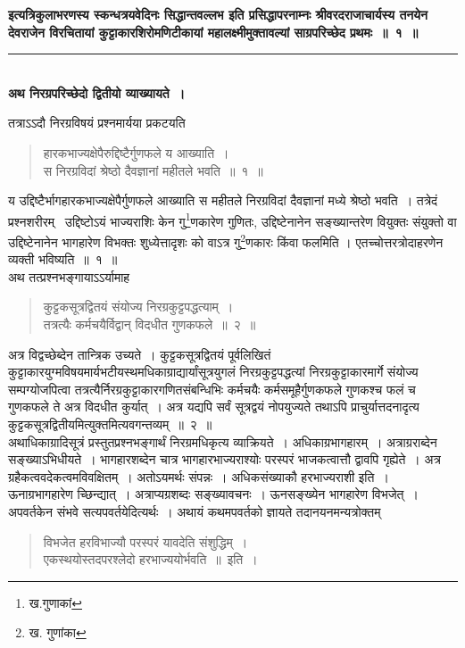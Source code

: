 \documentclass[11pt, openany]{book}
\begin{document}
\centering
\textbf{इत्यत्रिकुलाभरणस्य स्कन्धत्रयवेदिनः सिद्धान्तवल्लभ इति प्रसिद्धापरनाम्नः श्रीवरदराजाचार्यस्य तनयेन देवराजेन विरचितायां कुट्टाकारशिरोमणिटीकायां महालक्ष्मीमुक्तावल्यां साग्रपरिच्छेद प्रथमः~॥~१~॥\\}
\rule{0.2\linewidth}{1.0pt}\\
\vspace{1cm}
\justifying
\indent
\textbf{अथ निरग्रपरिच्छेदो द्वितीयो व्याख्यायते~। \\}

तत्राऽऽदौ निरग्रविषयं प्रश्नमार्यया प्रकटयति\textendash
\begin{quote}
{\ks हारकभाज्यक्षेपैरुद्दिष्टैर्गुणफले य आख्याति~।\\
स निरग्रविदां श्रेष्ठो दैवज्ञानां महीतले भवति~॥~१~॥}
\end{quote}
\indent
य उद्दिष्टैर्भागहारकभाज्यक्षेपैर्गुणफले आख्याति स महीतले निरग्रविदां दैवज्ञानां मध्ये श्रेष्ठो भवति~। तत्रेदं प्रश्नशरीरम् \textendash\ उद्दिष्टोऽयं भाज्यराशिः केन गु\renewcommand\thefootnote{१}\footnote{ख.गुणाकां}णकारेण गुणितः, उद्दिष्टेनानेन सङ्ख्यान्तरेण वियुक्तः संयुक्तो वा उद्दिष्टेनानेन भागहारेण विभक्तः शुध्येत्तादृशः को वाऽत्र गु\renewcommand\thefootnote{२}\footnote{ख. गुणांका}णकारः किंवा फलमिति । एतच्चोत्तरत्रोदाहरणेन व्यक्ती भविष्यति~॥~१~॥\\
\indent
अथ तत्प्रश्नभङ्गायाऽऽर्यामाह\textendash
\begin{quote}
{\ks कुट्टकसूत्रद्वितयं संयोज्य निरग्रकुट्टपद्धत्याम्~।\\
तत्रत्यैः कर्मचयैर्विद्वान् विदधीत गुणकफले~॥~२~॥}
\end{quote}

\newpage
\thispagestyle{fancy}
\fancyhf{}

\indent
अत्र विद्वच्छेब्देन तान्त्रिक उच्यते~। कुट्टकसूत्रद्वितयं पूर्वलिखितं कुट्टाकारयुग्मविषयमार्यभटीयस्थमधिकाग्राद्यार्यांसूत्रयुगलं निरग्रकुट्टपद्धत्यां निरग्रकुट्टाकारमार्गे संयोज्य सम्पग्योजपित्वा तत्रत्यैर्निरग्रकुट्टाकारगणितसंबन्धिभिः कर्मचयैः कर्मसमूहैर्गुणकफले गुणकश्च फलं च गुणकफले ते अत्र विदधीत कुर्यात्~। अत्र यद्यपि सर्वं सूत्रद्वयं नोपयुज्यते तथाऽपि प्राचुर्यात्तदनादृत्य कुट्टकसूत्रद्वितीयमित्युक्तमित्यवगन्तव्यम्~॥~२~॥\\

\indent
अथाधिकाग्रादिसूत्रं प्रस्तुतप्रश्नभङ्गार्थं निरग्रमधिकृत्य व्याक्रियते~। अधिकाग्रभागहारम्~। अत्राग्रराब्देन सङ्ख्याऽभिधीयते~। भागहारशब्देन चात्र भागहारभाज्यराश्योः परस्परं भाजकत्वात्तौ द्वावपि गृह्येते~। अत्र ग्रहैकत्ववदेकत्वमविवक्षितम्~। अतोऽयमर्थः संपन्नः~। अधिकसंख्याकौ हरभाज्यराशी इति~। ऊनाग्रभागहारेण च्छिन्द्यात्~। अत्राप्यग्रशब्दः सङ्ख्यावचनः~। ऊनसङ्ख्येन भागहारेण विभजेत्~। अपवर्तकेन संभवे सत्यपवर्तयेदित्यर्थः~। अथायं कथमपवर्तको ज्ञायते तदानयनमन्यत्रोक्तम्\textendash
\hspace{1cm}
\begin{quote}
{\qt
विभजेत हरविभाज्यौ परस्परं यावदेति संशुद्धिम्~।\\
एकस्थयोस्तदपरश्लेदो हरभाज्ययोर्भवति~॥~इति~।}
\end{quote}
\end{document}
